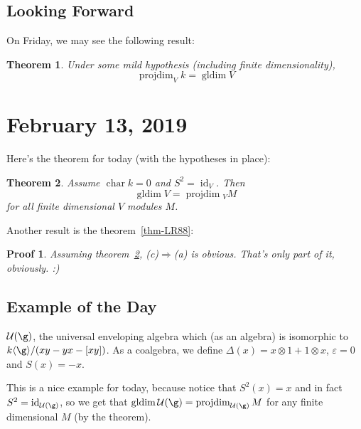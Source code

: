 \documentclass[12pt]{article}
\theoremstyle{break}
\theoremstyle{nonumberbreak}
\theoremstyle{changebreak}
\newtheorem{thm}{Theorem}[subsection]
\theoremstyle{break}
\theoremstyle{nonumberbreak}
\newtheorem{prf}{Proof}
\theoremstyle{nonumberplain}
\theoremstyle{change}
\DeclareMathOperator{\gldim}{gldim}
\DeclareMathOperator{\projdim}{projdim}
\DeclareMathOperator{\ch}{char}
\DeclareMathOperator{\id}{id}
\begin{document}
\subsection{Looking Forward}
On Friday, we may see the following result:
\begin{thm}
	Under some mild hypothesis (including finite dimensionality),
	\[\projdim_V k=\gldim V\]
\end{thm}

\section{February 13, 2019}
Here's the theorem for today (with the hypotheses in place):
\begin{thm}\label{thm-213}
	Assume $\ch k=0$ and $S^2=\id_V$. Then 
	\[\gldim V=\projdim{_VM}\]
	for all finite dimensional $V$ modules $M$.
\end{thm}
Another result is the theorem~\ref{thm-LR88}:
\begin{prf}
	Assuming theorem~\ref{thm-213}, (c)$\Rightarrow$(a) is obvious. That's only part of it, 
	obviously. :)
\end{prf}
\subsection{Example of the Day}
\begin{ex}
	$\mathcal{U}(\g)$, the universal enveloping algebra which (as an algebra) is isomorphic to
	$k\langle \g\rangle/(xy-yx-[xy])$. As a coalgebra, we define $\Delta(x)=x\otimes 1+1\otimes x$,
	$\varepsilon=0$ and $S(x)=-x$.

	This is a nice example for today, because notice that $S^2(x)=x$ and in fact $S^2=\id_{\mathcal{U}(\g)}$,
	so we get that $\gldim\mathcal{U}(\g)=\projdim_{\mathcal{U}(\g)}M$ for any finite dimensional $M$ (by 
	the theorem).
\end{ex}
\end{document}
